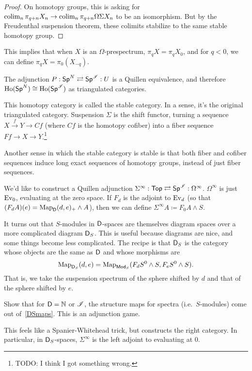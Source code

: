\begin{proof}
On homotopy groups, this is asking for $\operatorname*{colim}_n\pi_{q+n} X_n\to\operatorname*{colim}_n\pi_{q+n}\Omega\Sigma X_n$ to be an
isomorphism. But by the Freudenthal suspension theorem, these colimits stabilize to the same stable homotopy group.
\end{proof}
This implies that when $X$ is an $\Omega$-prespectrum, $\pi_q X = \pi_q X_0$, and for $q < 0$, we can define $\pi_q
X =\pi_0(X_{-q})$.
\begin{thm}
The adjunction $P: \mathsf{Sp}^N\rightleftarrows \mathsf{Sp}^\mathscr I: U$ is a Quillen equivalence, and therefore
$\operatorname{Ho}(\mathsf{Sp}^N)\cong\operatorname{Ho}(\mathsf{Sp}^\mathscr I)$ as triangulated categories.
\end{thm}
This homotopy category is called the stable category. In a sense, it's the original triangulated category.
Suspension $\Sigma$ is the shift functor, turning a sequence $X\stackrel f\to Y\to Cf$ (where $Cf$ is the homotopy
cofiber) into a fiber sequence $Ff\to X\to Y$.\footnote{{\color{red}TODO}: I think I got something wrong.}

Another sense in which the stable category is stable is that both fiber and cofiber sequences induce long exact
sequences of homotopy groups, instead of just fiber sequences.

We'd like to construct a Quillen adjunction $\Sigma^\infty:\mathsf{Top}\rightleftarrows\mathsf{Sp}^\mathscr I: \Omega^\infty$.
$\Omega^\infty$ is just $\operatorname{Ev}_0$, evaluating at the zero space. If $F_d$ is the adjoint to $\operatorname{Ev}_d$ (so that
$(F_dA)(e) = \operatorname{Map}_\mathsf D(d, e)_+\wedge A$), then we can define $\Sigma^\infty A\coloneqq F_0A\wedge S$.

It turns out that $S$-modules in $\mathsf D$-spaces are themselves diagram spaces over a more complicated diagram
$\mathsf D_S$. This is useful because diagrams are nice, and some things become less complicated. The recipe is that
$\mathsf D_S$ is the category whose objects are the same as $\mathsf D$ and whose morphisms are
\begin{equation}
\label{DSmaps}
\operatorname{Map}_{\mathsf D_S}(d,e) = \operatorname{Map}_{\mathsf{Mod}_S}(F_d S^0\wedge S, F_eS^0\wedge S).
\end{equation}
That is, we take the suspension spectrum of the sphere shifted by $d$ and that of the sphere shifted by $e$.
\begin{ex}
Show that for $\mathsf D = \mathbb N$ or $\mathscr I$, the structure maps for spectra (i.e.\ $S$-modules) come out of~\eqref{DSmaps}.
This is an adjunction game.
\end{ex}
This feels like a Spanier-Whitehead trick, but constructs the right category. In particular, in $\mathsf D_S$-spaces,
$\Sigma^\infty$ is the left adjoint to evaluating at $0$.

